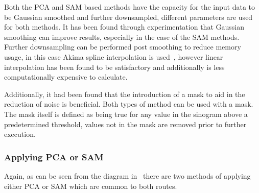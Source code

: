                     Both the \gls{PCA} and \gls{SAM} based methods have the capacity for the input data to be Gaussian smoothed and further downsampled, different parameters are used for both methods. It has been found through experimentation that Gaussian smoothing can improve results, especially in the case of the \gls{SAM} methods. Further downsampling can be performed post smoothing to reduce memory usage, in this case Akima spline interpolation is used~, however linear interpolation has been found to be satisfactory and additionally is less computationally expensive to calculate.
                        
                    Additionally, it had been found that the introduction of a mask to aid in the reduction of noise is beneficial. Both types of method can be used with a mask. The mask itself is defined as being true for any value in the sinogram above a predetermined threshold, values not in the mask are removed prior to further execution.
                
                \subsubsection{Applying PCA or SAM} \label{sec:pca_data_driven_surrogate_signal_extraction_methods_for_dynamic_pet_methods_applying_pca_or_sam}
                    Again, as can be seen from the diagram in~ there are two methods of applying either \gls{PCA} or \gls{SAM} which are common to both routes.
                    

